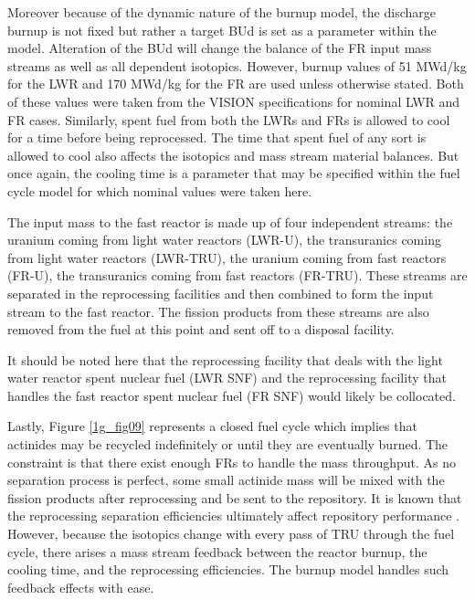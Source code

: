 Moreover because of the dynamic nature of the burnup model, the discharge burnup is not fixed but rather a 
target BUd is set as a parameter within the model.  Alteration of the BUd will change the balance of the FR 
input mass streams as well as all dependent isotopics.  However, burnup values of 51 MWd/kg for the LWR and 
170 MWd/kg for the FR are used unless otherwise stated.  Both of these values were taken from the 
VISION \cite{Jacobson2009} 
specifications for nominal LWR and FR cases.  Similarly, spent fuel from both the LWRs and FRs is allowed to 
cool for a time before being reprocessed.  The time that spent fuel of any sort is allowed to cool also 
affects the isotopics and mass stream material balances.  But once again, the cooling time is a parameter 
that may be specified within the fuel cycle model for which nominal values were taken here.

The input mass to the fast reactor is made up of four independent streams: the uranium coming from light 
water reactors (LWR-U), the transuranics coming from light water reactors (LWR-TRU), the uranium coming 
from fast reactors (FR-U), the transuranics coming from fast reactors (FR-TRU).  These streams are separated 
in the reprocessing facilities and then combined to form the input stream to the fast reactor.  The fission 
products from these streams are also removed from the fuel at this point and sent off to a disposal facility.  

It should be noted here that the reprocessing facility that deals with the light water reactor spent nuclear 
fuel (LWR SNF) and the reprocessing facility that handles the fast reactor spent nuclear fuel (FR SNF) 
would likely be collocated.

Lastly, Figure \ref{1g_fig09} represents a closed fuel cycle which implies that actinides may be recycled 
indefinitely or until they are eventually burned.  The constraint is that there exist enough FRs to handle 
the mass throughput.  As no separation process is perfect, some small 
actinide mass will be mixed with the fission products after reprocessing and be sent to the repository.  
It is known that the reprocessing separation efficiencies ultimately affect repository 
performance \cite{Wigeland2006}.  
However, because the isotopics change with every pass of TRU through the fuel cycle, there arises a mass 
stream feedback between the reactor burnup, the cooling time, and the reprocessing efficiencies. 
The burnup model handles such feedback effects with ease. 

